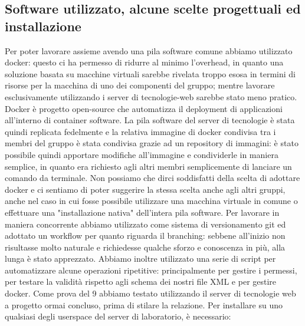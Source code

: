\subsection{Software utilizzato, alcune scelte progettuali ed installazione}
Per poter lavorare assieme avendo una pila software comune abbiamo utilizzato docker: questo ci ha permesso di ridurre al minimo l'overhead, in quanto una soluzione basata su macchine virtuali sarebbe rivelata troppo esosa in termini di risorse per la macchina di uno dei componenti del gruppo; mentre lavorare esclusivamente utilizzando i server di tecnologie-web sarebbe stato meno pratico.
Docker è progetto open-source che automatizza il deployment di applicazioni all'interno di container software.
La pila software del server di tecnologie è stata quindi replicata fedelmente e la relativa immagine di docker condivisa tra i membri del gruppo è stata condivisa grazie ad un repository di immagini: è stato possibile quindi apportare modifiche all'immagine e condividerle in maniera semplice, in quanto era richiesto agli altri membri semplicemente di lanciare un comando da terminale.
Non possiamo che dirci soddisfatti della scelta di adottare docker e ci sentiamo di poter suggerire la stessa scelta anche agli altri gruppi, anche nel caso in cui fosse possibile utilizzare una macchina virtuale in comune o effettuare una "installazione nativa" dell'intera pila software.
Per lavorare in maniera concorrente abbiamo utilizzato come sistema di versionamento git ed adottato un workflow per quanto riguarda il branching: sebbene all'inizio non risultasse molto naturale e richiedesse qualche sforzo e conoscenza in più, alla lunga è stato apprezzato.
Abbiamo inoltre utilizzato una serie di script per automatizzare alcune operazioni ripetitive: principalmente per gestire i permessi, per testare la validità rispetto agli schema dei nostri file XML e per gestire docker.
Come prova del 9 abbiamo testato utilizzando il server di tecnologie web a progetto ormai concluso, prima di stilare la relazione.
Per installare su uno qualsiasi degli userspace del server di laboratorio, è necessario: